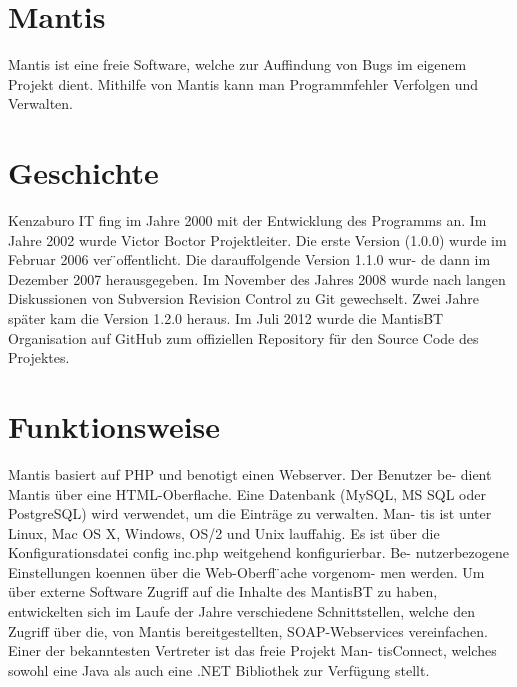 \section{Mantis}
Mantis ist eine freie Software, welche zur Auffindung von Bugs im eigenem
Projekt dient. Mithilfe von Mantis kann man Programmfehler Verfolgen und
Verwalten.
\section{Geschichte}
Kenzaburo IT fing im Jahre 2000 mit der Entwicklung des Programms an.
Im Jahre 2002 wurde Victor Boctor Projektleiter. Die erste Version (1.0.0)
wurde im Februar 2006 ver ̈offentlicht. Die darauffolgende Version 1.1.0 wur-
de dann im Dezember 2007 herausgegeben. Im November des Jahres 2008
wurde nach langen Diskussionen von Subversion Revision Control zu Git
gewechselt. Zwei Jahre später kam die Version 1.2.0 heraus. Im Juli 2012
wurde die MantisBT Organisation auf GitHub zum offiziellen Repository
für den Source Code des Projektes.
\section{Funktionsweise}
Mantis basiert auf PHP und benotigt einen Webserver. Der Benutzer be-
dient Mantis über eine HTML-Oberflache. Eine Datenbank (MySQL, MS
SQL oder PostgreSQL) wird verwendet, um die Einträge zu verwalten. Man-
tis ist unter Linux, Mac OS X, Windows, OS/2 und Unix lauffahig. Es ist
über die Konfigurationsdatei config inc.php weitgehend konfigurierbar. Be-
nutzerbezogene Einstellungen koennen über die Web-Oberfl ̈ache vorgenom-
men werden. Um über externe Software Zugriff auf die Inhalte des MantisBT
zu haben, entwickelten sich im Laufe der Jahre verschiedene Schnittstellen,
welche den Zugriff über die, von Mantis bereitgestellten, SOAP-Webservices
vereinfachen. Einer der bekanntesten Vertreter ist das freie Projekt Man-
tisConnect, welches sowohl eine Java als auch eine .NET Bibliothek zur
Verfügung stellt.
